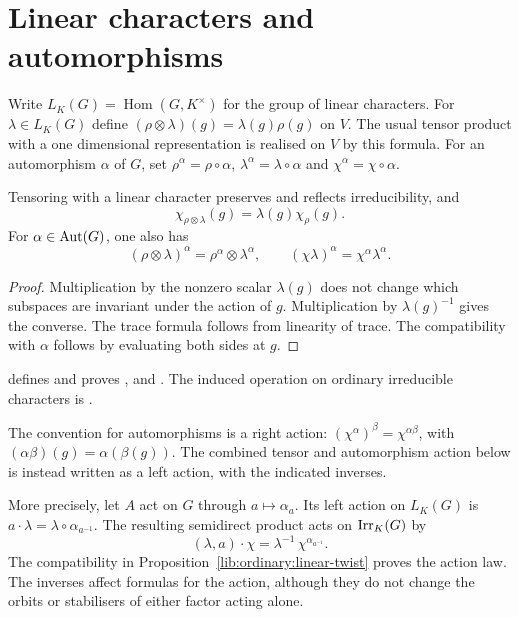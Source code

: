 \section{Linear characters and automorphisms}
\label{lib:ordinary:actions}

Write $L_K(G)=\operatorname{Hom}(G,K^\times)$ for the group of linear
characters. For $\lambda\in L_K(G)$ define
$(\rho\otimes\lambda)(g)=\lambda(g)\rho(g)$ on $V$. The usual tensor
product with a one dimensional representation is realised on $V$ by
this formula. For an automorphism $\alpha$ of $G$, set
$\rho^\alpha=\rho\circ\alpha$, $\lambda^\alpha=\lambda\circ\alpha$
and $\chi^\alpha=\chi\circ\alpha$.

\begin{proposition}
\label{lib:ordinary:linear-twist}
Tensoring with a linear character preserves and reflects irreducibility,
and
\[
 \chi_{\rho\otimes\lambda}(g)=\lambda(g)\chi_\rho(g).
\]
For $\alpha\in\operatorname{Aut}(G)$, one also has
\[
 (\rho\otimes\lambda)^\alpha
   =\rho^\alpha\otimes\lambda^\alpha,
 \qquad
 (\chi\lambda)^\alpha=\chi^\alpha\lambda^\alpha.
\]
\end{proposition}
\begin{proof}
Multiplication by the nonzero scalar $\lambda(g)$ does not change which
subspaces are invariant under the action of $g$. Multiplication by
$\lambda(g)^{-1}$ gives the converse. The trace formula follows from
linearity of trace. The compatibility with $\alpha$ follows by evaluating
both sides at $g$.
\end{proof}

\begin{implementation}
 defines
 and proves
,
 and
.
The induced operation on ordinary irreducible characters is
.
\end{implementation}

The convention for automorphisms is a right action:
$(\chi^\alpha)^\beta=\chi^{\alpha\beta}$, with
$(\alpha\beta)(g)=\alpha(\beta(g))$. The combined tensor and automorphism
action below is instead written as a left action, with the indicated inverses.

More precisely, let $A$ act on $G$ through $a\mapsto\alpha_a$. Its left
action on $L_K(G)$ is $a\cdot\lambda=\lambda\circ\alpha_{a^{-1}}$.
The resulting semidirect product acts on $\operatorname{Irr}_K(G)$ by
\[
 (\lambda,a)\cdot\chi
   =\lambda^{-1}\,\chi^{\alpha_{a^{-1}}}.
\]
The compatibility in Proposition~\ref{lib:ordinary:linear-twist} proves
the action law. The inverses affect formulas for the action, although they
do not change the orbits or stabilisers of either factor acting alone.

